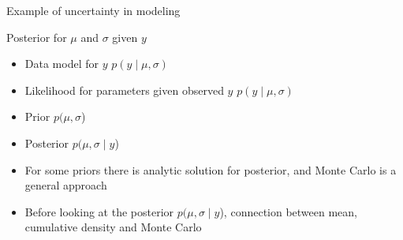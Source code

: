 \documentclass[finnish,english,t]{beamer}
\DeclareMathOperator{\normal}{normal}
\begin{document}
\begin{frame}{Example of uncertainty in modeling}

  

\end{frame}



\begin{frame}{Posterior for $\mu$ and $\sigma$ given $y$}

  \begin{itemize}
  \item<+-> Data model for $y$ $p(y \mid \mu, \sigma)$
  \item<+-> Likelihood for parameters given observed $y$ $p(y \mid \mu, \sigma)$
  \item<+-> Prior $p(\mu, \sigma$)
  \item<+-> Posterior $p(\mu, \sigma \mid y $)
  \item<+-> For some priors there is analytic solution for posterior,
    and Monte Carlo is a general approach
  \item<+-> Before looking at the posterior $p(\mu, \sigma \mid y $),
    connection between mean, cumulative density and Monte Carlo
  \end{itemize}
  
\end{frame}
\end{document}
